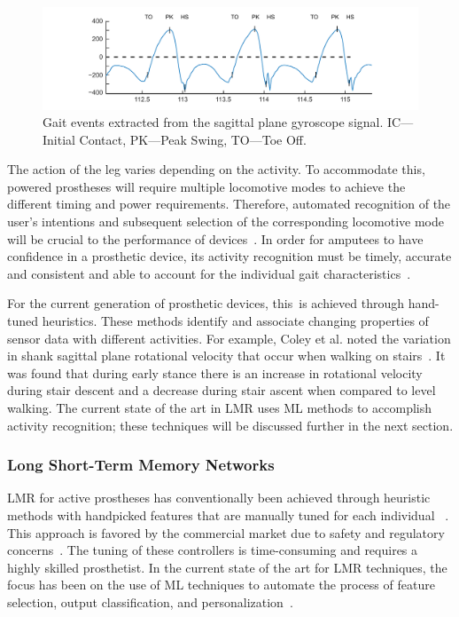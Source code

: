 \begin{figure}[!hbt]
    \centering
    \includegraphics[width=\textwidth]{content/4-LSTM_Behaviour/gyro_trace_hs.pdf}
    \caption[Gait events extracted from the sagittal plane gyroscope signal.]{Gait events extracted from the sagittal plane gyroscope signal. IC---Initial Contact, PK---Peak Swing, TO---Toe Off.}
    \label{fig:y-gyro-hs-to}
\end{figure}

The action of the leg varies depending on the activity. To accommodate this, powered prostheses will require multiple locomotive modes to achieve the different timing and power requirements. Therefore, automated recognition of the user's intentions and subsequent selection of the corresponding locomotive mode will be crucial to the performance of devices~\cite{Tucker2015, Windrich2016, Zhang2015}. In order for amputees to have confidence in a prosthetic device, its activity recognition must be timely, accurate and consistent and able to account for the individual gait characteristics~\cite{Pedroli2019, Sinha2011, Ponce2016}.

For the current generation of prosthetic devices, this~is achieved through hand-tuned heuristics. These methods identify and associate changing properties of sensor data with different activities. For example, Coley et al. noted the variation in shank sagittal plane rotational velocity that occur when walking on stairs~\cite{Coley2005}. It was found that during early stance there is an increase in rotational velocity during stair descent and a decrease during stair ascent when compared to level walking. The current state of the art in LMR uses ML methods to accomplish activity recognition; these techniques will be discussed further in the next section.

\subsubsection{Long Short-Term Memory Networks}
\label{sec:lstm_therory}
LMR for active prostheses has conventionally been achieved through heuristic methods with handpicked features that are manually tuned for each individual ~\cite{Maqbool2017, Xu2018}. This approach is favored by the commercial market due to safety and regulatory concerns~\cite{Fluit2020}.  The tuning of these controllers is time-consuming and requires a highly skilled prosthetist. In the current state of the art for LMR techniques, the focus has been on the use of ML techniques to automate the process of feature selection, output classification, and personalization~\cite{Labarriere2020}.

